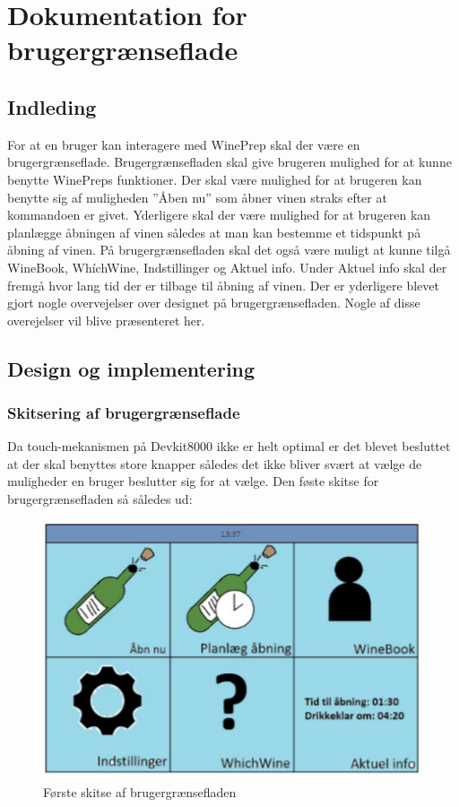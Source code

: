 \chapter*{Dokumentation for brugergrænseflade}

\section*{Indleding}

For at en bruger kan interagere med WinePrep skal der være en brugergrænseflade. Brugergrænsefladen skal give brugeren mulighed for at kunne benytte WinePreps funktioner. Der skal være mulighed for at brugeren kan benytte sig af muligheden ”Åben nu” som åbner vinen straks efter at kommandoen er givet. Yderligere skal der være mulighed for at brugeren kan planlægge åbningen af vinen således at man kan bestemme et tidspunkt på åbning af vinen. På brugergrænsefladen skal det også være muligt at kunne tilgå WineBook, WhíchWine, Indstillinger og Aktuel info. Under Aktuel info skal der fremgå hvor lang tid der er tilbage til åbning af vinen. Der er yderligere blevet gjort nogle overvejelser over designet på brugergrænsefladen. Nogle af disse overejelser vil blive præsenteret her.

\section*{Design og implementering}
\subsection*{Skitsering af brugergrænseflade}

Da touch-mekanismen på Devkit8000 ikke er helt optimal er det blevet besluttet at der skal benyttes store knapper således det ikke bliver svært at vælge de muligheder en bruger beslutter sig for at vælge. Den føste skitse for brugergrænsefladen så således ud:

\begin{figure}[H]
\includegraphics{Billeder/skitse}
\caption{Første skitse af brugergrænsefladen}
\end{figure}

